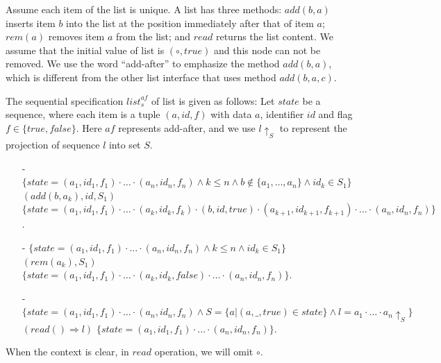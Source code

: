 {\begin{example}
\label{definition:spec-list-add-after}
Assume each item of the list is unique. A list has three methods:
$\mathit{add}(b,a)$ inserts item $b$ into the list at the position
immediately after that of item $a$; $\mathit{rem}(a)$ removes item $a$
from the list; and $\mathit{read}$ returns the list content. We assume
that the initial value of list is $(\circ,\mathit{true})$ and this
node can not be removed. We use the word ``add-after'' to emphasize
the method $\mathit{add}(b,a)$, which is different from the other list
interface that uses method $\mathit{add}(b,a,c)$.

The sequential specification $\mathit{list}_s^{\mathit{af}}$ of list
is given as follows: Let $\mathit{state}$ be a sequence, where each
item is a tuple $(a,\mathit{id},f)$ with data $a$, identifier
$\mathit{id}$ and flag $f \in \{ \mathit{true},\mathit{false} \}$.
Here $\mathit{af}$ represents add-after, and we use $l \uparrow_{S}$
to represent the projection of sequence $l$ into set $S$.
\begin{itemize}
\setlength{\itemsep}{0.5pt}
\item[-] $\{ \mathit{state} = (a_1,\mathit{id}_1,f_1) \cdot \ldots
  \cdot (a_n,\mathit{id}_n,f_n) \wedge k \leq n \wedge b \notin \{
  a_1, \ldots, a_n \} \wedge \mathit{id}_k \in S_1 \}$
  $(add(b,a_k),\mathit{id},S_1)$ $\{ \mathit{state} =
  (a_1,\mathit{id}_1,f_1) \cdot \ldots \cdot (a_k,\mathit{id}_k,f_k)
  \cdot (b,\mathit{id},\mathit{true}) \cdot
  (a_{k+1},\mathit{id}_{k+1},f_{k+1}) \cdot \ldots \cdot
  (a_n,\mathit{id}_n,f_n) \}$.
\item[-] $\{ \mathit{state} = (a_1,\mathit{id}_1,f_1) \cdot \ldots
  \cdot (a_n,\mathit{id}_n,f_n) \wedge k \leq n \wedge \mathit{id}_k
  \in S_1 \}$ $(rem(a_k),S_1)$ $\{ \mathit{state} =
  (a_1,\mathit{id}_1,f_1) \cdot \ldots \cdot
  (a_k,\mathit{id}_k,\mathit{false}) \cdot \ldots \cdot
  (a_n,\mathit{id}_n,f_n) \}$.
\item[-] $\{ \mathit{state} = (a_1,\mathit{id}_1,f_1) \cdot \ldots
  \cdot (a_n,\mathit{id}_n,f_n) \wedge S = \{ a \vert
  (a,\_,\mathit{true}) \in \mathit{state} \} \wedge l = a_1 \cdot
  \ldots \cdot a_n \uparrow_{S} \}$ $(read() \Rightarrow l)$ $\{
  \mathit{state} = (a_1,\mathit{id}_1,f_1) \cdot \ldots \cdot
  (a_n,\mathit{id}_n,f_n) \}$.
\end{itemize}
When the context is clear, in $\mathit{read}$ operation, we will omit
$\circ$.
\end{example}
}
